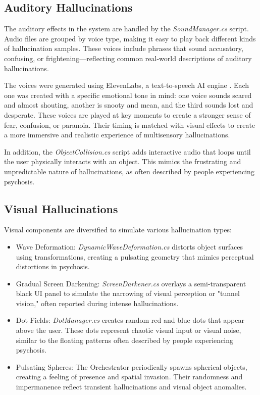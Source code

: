 \subsection{Auditory Hallucinations}

The auditory effects in the system are handled by the \textit{SoundManager.cs} script. Audio files are grouped by voice type, making it easy to play back different kinds of hallucination samples. These voices include phrases that sound accusatory, confusing, or frightening—reflecting common real-world descriptions of auditory hallucinations.
    
The voices were generated using ElevenLabs, a text-to-speech AI engine \cite{elevenlabs}. Each one was created with a specific emotional tone in mind: one voice sounds scared and almost shouting, another is snooty and mean, and the third sounds lost and desperate. These voices are played at key moments to create a stronger sense of fear, confusion, or paranoia. Their timing is matched with visual effects to create a more immersive and realistic experience of multisensory hallucinations.
    
In addition, the \textit{ObjectCollision.cs} script adds interactive audio that loops until the user physically interacts with an object. This mimics the frustrating and unpredictable nature of hallucinations, as often described by people experiencing psychosis.
    
    
\subsection{Visual Hallucinations}
Visual components are diversified to simulate various hallucination types:
\begin{itemize}
    \item Wave Deformation: \textit{DynamicWaveDeformation.cs} distorts object surfaces using transformations, creating a pulsating geometry that mimics perceptual distortions in psychosis.
    \item Gradual Screen Darkening: \textit{ScreenDarkener.cs} overlays a semi-transparent black UI panel to simulate the narrowing of visual perception or "tunnel vision," often reported during intense hallucinations.
    \item Dot Fields: \textit{DotManager.cs} creates random red and blue dots that appear above the user. These dots represent chaotic visual input or visual noise, similar to the floating patterns often described by people experiencing psychosis.
    \item Pulsating Spheres: The Orchestrator periodically spawns spherical objects, creating a feeling of presence and spatial invasion. Their randomness and impermanence reflect transient hallucinations and visual object anomalies.
\end{itemize}

